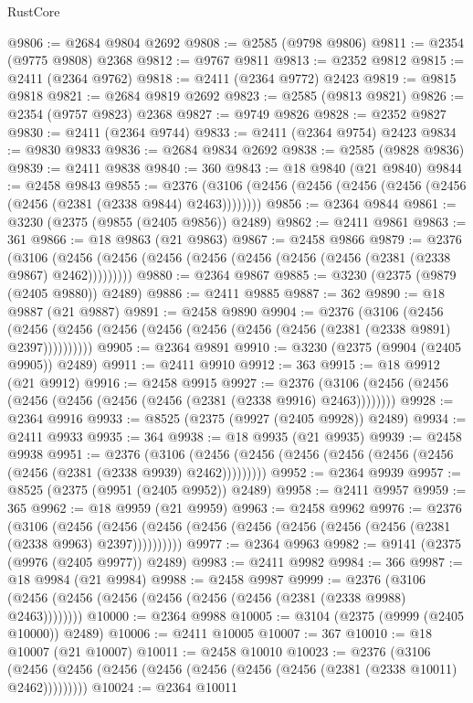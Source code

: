 \begin{lexlean}{RustCore}
\begin{coremodule}
@9806 := @2684 @9804 @2692
@9808 := @2585 (@9798 @9806)
@9811 := @2354 (@9775 @9808) @2368
@9812 := @9767 @9811
@9813 := @2352 @9812
@9815 := @2411 (@2364 @9762)
@9818 := @2411 (@2364 @9772) @2423
@9819 := @9815 @9818
@9821 := @2684 @9819 @2692
@9823 := @2585 (@9813 @9821)
@9826 := @2354 (@9757 @9823) @2368
@9827 := @9749 @9826
@9828 := @2352 @9827
@9830 := @2411 (@2364 @9744)
@9833 := @2411 (@2364 @9754) @2423
@9834 := @9830 @9833
@9836 := @2684 @9834 @2692
@9838 := @2585 (@9828 @9836)
@9839 := @2411 @9838
@9840 := 360
@9843 := @18 @9840 (@21 @9840)
@9844 := @2458 @9843
@9855 := @2376 (@3106 (@2456 (@2456 (@2456 (@2456 (@2456 (@2456 (@2381 (@2338 @9844) @2463))))))))
@9856 := @2364 @9844
@9861 := @3230 (@2375 (@9855 (@2405 @9856)) @2489)
@9862 := @2411 @9861
@9863 := 361
@9866 := @18 @9863 (@21 @9863)
@9867 := @2458 @9866
@9879 := @2376
    (@3106 (@2456 (@2456 (@2456 (@2456 (@2456 (@2456 (@2456 (@2381 (@2338 @9867) @2462)))))))))
@9880 := @2364 @9867
@9885 := @3230 (@2375 (@9879 (@2405 @9880)) @2489)
@9886 := @2411 @9885
@9887 := 362
@9890 := @18 @9887 (@21 @9887)
@9891 := @2458 @9890
@9904 := @2376
    (@3106
      (@2456 (@2456 (@2456 (@2456 (@2456 (@2456 (@2456 (@2456 (@2381 (@2338 @9891) @2397))))))))))
@9905 := @2364 @9891
@9910 := @3230 (@2375 (@9904 (@2405 @9905)) @2489)
@9911 := @2411 @9910
@9912 := 363
@9915 := @18 @9912 (@21 @9912)
@9916 := @2458 @9915
@9927 := @2376 (@3106 (@2456 (@2456 (@2456 (@2456 (@2456 (@2456 (@2381 (@2338 @9916) @2463))))))))
@9928 := @2364 @9916
@9933 := @8525 (@2375 (@9927 (@2405 @9928)) @2489)
@9934 := @2411 @9933
@9935 := 364
@9938 := @18 @9935 (@21 @9935)
@9939 := @2458 @9938
@9951 := @2376
    (@3106 (@2456 (@2456 (@2456 (@2456 (@2456 (@2456 (@2456 (@2381 (@2338 @9939) @2462)))))))))
@9952 := @2364 @9939
@9957 := @8525 (@2375 (@9951 (@2405 @9952)) @2489)
@9958 := @2411 @9957
@9959 := 365
@9962 := @18 @9959 (@21 @9959)
@9963 := @2458 @9962
@9976 := @2376
    (@3106
      (@2456 (@2456 (@2456 (@2456 (@2456 (@2456 (@2456 (@2456 (@2381 (@2338 @9963) @2397))))))))))
@9977 := @2364 @9963
@9982 := @9141 (@2375 (@9976 (@2405 @9977)) @2489)
@9983 := @2411 @9982
@9984 := 366
@9987 := @18 @9984 (@21 @9984)
@9988 := @2458 @9987
@9999 := @2376 (@3106 (@2456 (@2456 (@2456 (@2456 (@2456 (@2456 (@2381 (@2338 @9988) @2463))))))))
@10000 := @2364 @9988
@10005 := @3104 (@2375 (@9999 (@2405 @10000)) @2489)
@10006 := @2411 @10005
@10007 := 367
@10010 := @18 @10007 (@21 @10007)
@10011 := @2458 @10010
@10023 := @2376
    (@3106 (@2456 (@2456 (@2456 (@2456 (@2456 (@2456 (@2456 (@2381 (@2338 @10011) @2462)))))))))
@10024 := @2364 @10011

\end{coremodule}
\end{lexlean}
